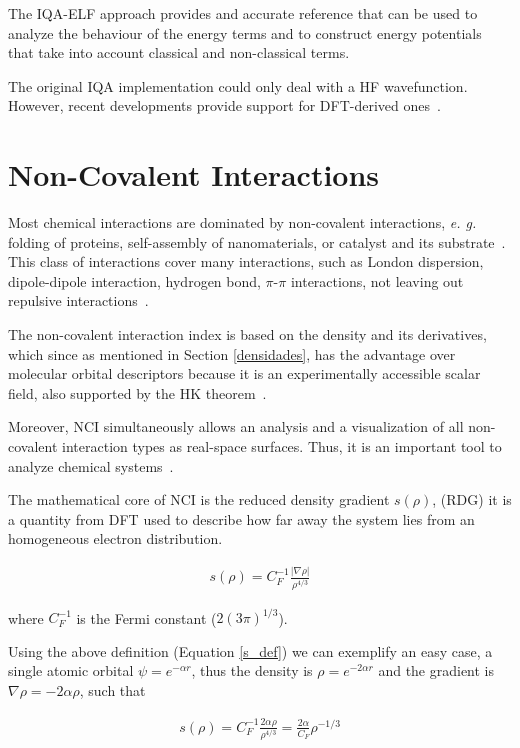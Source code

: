 The IQA-ELF approach provides and accurate reference that can be used to
analyze the behaviour of the energy terms and to construct energy potentials
that take into account classical and non-classical terms. 

The original IQA implementation could only deal with a HF wavefunction.
However, recent developments provide support for DFT-derived
ones~\cite{Maxwell2016}.

\section{Non-Covalent Interactions}

Most chemical interactions are dominated by non-covalent interactions,
\textit{e. g.} folding of proteins, self-assembly of nanomaterials, or catalyst
and its substrate~\cite{Fenniri2001}. This class of interactions cover many
interactions, such as London dispersion, dipole-dipole interaction, hydrogen
bond, $\pi$-$\pi$ interactions, not leaving out repulsive
interactions~\cite{kollman1977noncovalent}.

The non-covalent interaction index is based on the density and its derivatives,
which since as mentioned in Section \ref{densidades}, has the advantage over
molecular orbital descriptors because it is an experimentally accessible scalar
field, also supported by the HK theorem~\cite{Hohenberg1964}.

Moreover, NCI simultaneously allows an analysis and a visualization of all
non-covalent interaction types as real-space surfaces. Thus, it is an important
tool to analyze chemical
systems~\cite{Julia_Contreras_G2011_1,ContrerasG2011_2}.

The mathematical core of NCI is the reduced density gradient $s(\rho)$,
(\gls{RDG}) it is a quantity from DFT used to describe how far away the system
lies from an homogeneous electron distribution.

\begin{align}
  s(\rho) = C_F^{-1} \frac{|\nabla\rho|}{\rho^{4/3}}
\label{s_def}
\end{align}

\noindent where $C_F^{-1}$ is the Fermi constant ($2(3\pi)^{1/3}$).

Using the above definition (Equation \ref{s_def}) we can exemplify an easy
case, a single atomic orbital $\psi = e^{-\alpha r}$, thus the density is $\rho
= e^{-2\alpha r}$ and the gradient is $\nabla\rho = -2\alpha\rho$, such that

\begin{align}
  s(\rho) = C_F^{-1}\frac{2\alpha\rho}{\rho^{4/3}} = \frac{2\alpha}{C_F}\rho^{-1/3}
\end{align}

